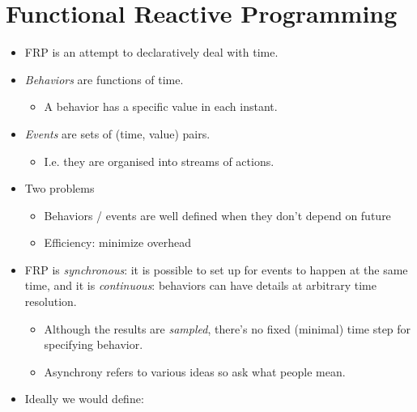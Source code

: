 \documentclass{beamer}
\newcommand{\tmem}[1]{{\em #1\/}}
\begin{document}
\section{Functional Reactive Programming}

\begin{itemize}
  \item FRP is an attempt to declaratively deal with time.
  
  \item {\tmem{Behaviors}} are functions of time.
  \begin{itemize}
    \item A behavior has a specific value in each instant.
  \end{itemize}
  \item {\tmem{Events}} are sets of (time, value) pairs.
  \begin{itemize}
    \item I.e. they are organised into streams of actions.
  \end{itemize}
  \item Two problems
  \begin{itemize}
    \item Behaviors / events are well defined when they don't depend on future
    
    \item Efficiency: minimize overhead
  \end{itemize}
  \item FRP is {\tmem{synchronous}}: it is possible to set up for events to
  happen at the same time, and it is {\tmem{continuous}}: behaviors can have
  details at arbitrary time resolution.
  \begin{itemize}
    \item Although the results are {\tmem{sampled}}, there's no fixed
    (minimal) time step for specifying behavior.
    
    \item {\small{Asynchrony refers to various ideas so ask what people
    mean.}}
  \end{itemize}
  \item Ideally we would define:
  
  {}{}{\hlopt{= }}{}{\hlendline{}}\\
  {}{}{\hlopt{= }}{}{\hlopt{->
  }}{}{}\\
  {}{}{\hlopt{= (}}{}{\hlopt{,
  }}{}{\hlopt{) }}{}{}
  

\end{itemize}
\end{document}
